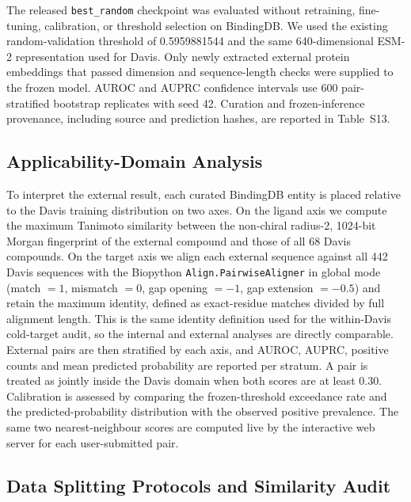 \documentclass[fleqn,10pt]{wlscirep}
\begin{document}
The released \texttt{best\_random} checkpoint was evaluated without retraining,
fine-tuning, calibration, or threshold selection on BindingDB.  We used the
existing random-validation threshold of 0.5959881544 and the same
640-dimensional ESM-2 representation used for Davis. Only newly extracted
external protein embeddings that passed dimension and sequence-length checks
were supplied to the frozen model.
AUROC and AUPRC confidence intervals use 600 pair-stratified bootstrap
replicates with seed 42.  Curation and frozen-inference provenance, including
source and prediction hashes, are reported in Table~S13.

\begingroup\color{red}
\subsection{Applicability-Domain Analysis}
\label{sec:ad_methods}

To interpret the external result, each curated BindingDB entity is placed
relative to the Davis training distribution on two axes.  On the ligand axis we
compute the maximum Tanimoto similarity between the non-chiral radius-2,
1024-bit Morgan fingerprint of the external compound and those of all 68 Davis
compounds.  On the target axis we align each external sequence against all 442
Davis sequences with the Biopython \texttt{Align.PairwiseAligner} in global mode
(match $=1$, mismatch $=0$, gap opening $=-1$, gap extension $=-0.5$) and retain
the maximum identity, defined as exact-residue matches divided by full alignment
length.  This is the same identity definition used for the within-Davis
cold-target audit, so the internal and external analyses are directly
comparable.  External pairs are then stratified by each axis, and AUROC, AUPRC,
positive counts and mean predicted probability are reported per stratum.  A pair
is treated as jointly inside the Davis domain when both scores are at least
0.30.  Calibration is assessed by comparing the frozen-threshold exceedance rate
and the predicted-probability distribution with the observed positive
prevalence.  The same two nearest-neighbour scores are computed live by the
interactive web server for each user-submitted pair.
\endgroup

\subsection{Data Splitting Protocols and Similarity Audit}
\end{document}
